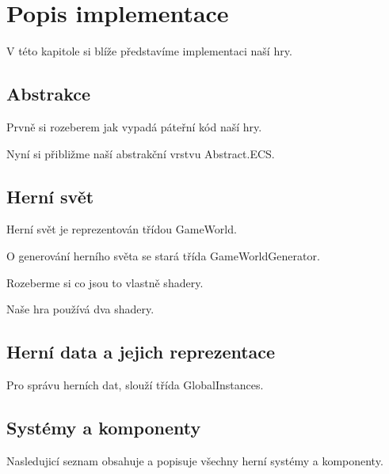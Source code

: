 \chapter{Popis implementace}
V této kapitole si blíže představíme implementaci naší hry.

\section{Abstrakce}
Prvně si rozeberem jak vypadá páteřní kód naší hry.


Nyní si přibližme naší abstrakční vrstvu Abstract.ECS.


\section{Herní svět}
Herní svět je reprezentován třídou GameWorld.

O generování herního světa se stará třída GameWorldGenerator.

Rozeberme si co jsou to vlastně shadery.

Naše hra používá dva shadery.


\section{Herní data a jejich reprezentace}

Pro správu herních dat, slouží třída GlobalInstances.



\section{Systémy a komponenty}

Nasledujicí seznam obsahuje a popisuje všechny herní systémy a komponenty.